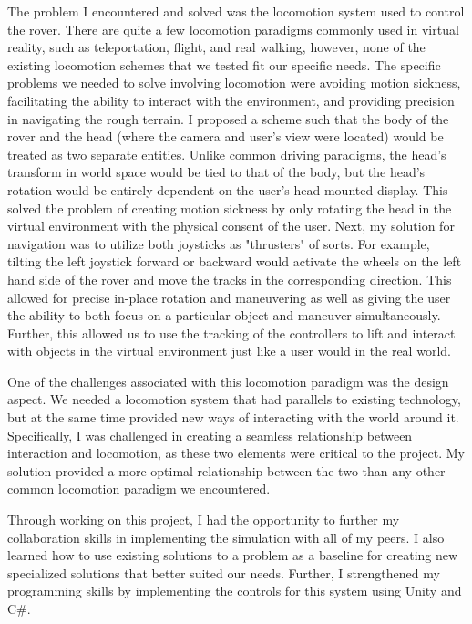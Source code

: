 \documentclass{letter} %
\begin{document}
\begin{letter}
\noindent The problem I encountered and solved was the locomotion system used to control the rover. There are quite a few locomotion paradigms commonly used in virtual reality, such as teleportation, flight, and real walking, however, none of the existing locomotion schemes that we tested fit our specific needs. The specific problems we needed to solve involving locomotion were avoiding motion sickness, facilitating the ability to interact with the environment, and providing precision in navigating the rough terrain. I proposed a scheme such that the body of the rover and the head (where the camera and user's view were located) would be treated as two separate entities. Unlike common driving paradigms, the head's transform in world space would be tied to that of the body, but the head's rotation would be entirely dependent on the user's head mounted display. This solved the problem of creating motion sickness by only rotating the head in the virtual environment with the physical consent of the user. Next, my solution for navigation was to utilize both joysticks as "thrusters" of sorts. For example, tilting the left joystick forward or backward would activate the wheels on the left hand side of the rover and move the tracks in the corresponding direction. This allowed for precise in-place rotation and maneuvering as well as giving the user the ability to both focus on a particular object and maneuver simultaneously. Further, this allowed us to use the tracking of the controllers to lift and interact with objects in the virtual environment just like a user would in the real world.

\noindent One of the challenges associated with this locomotion paradigm was the design aspect. We needed a locomotion system that had parallels to existing technology, but at the same time provided new ways of interacting with the world around it. Specifically, I was challenged in creating a seamless relationship between interaction and locomotion, as these two elements were critical to the project. My solution provided a more optimal relationship between the two than any other common locomotion paradigm we encountered.

\noindent Through working on this project, I had the opportunity to further my collaboration skills in implementing the simulation with all of my peers. I also learned how to use existing solutions to a problem as a baseline for creating new specialized solutions that better suited our needs. Further, I strengthened my programming skills by implementing the controls for this system using Unity and C$\#$.



 

\end{letter}
 
\end{document}
